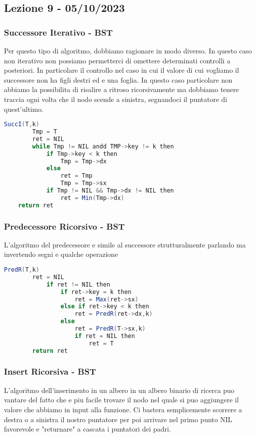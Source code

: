 \subsection{Lezione 9 - 05/10/2023}

\subsubsection{Successore Iterativo - BST}

Per questo tipo di algoritmo, dobbiamo ragionare in modo diverso. In questo caso non iterativo non possiamo permetterci di omettere determinati controlli a posteriori. In particolare il controllo nel caso in cui il valore di cui vogliamo il successore non ha figli destri ed e una foglia. In questo caso particolare non abbiamo la possibilita di risalire a ritroso ricorsivamente ma dobbiamo tenere traccia ogni volta che il nodo scende a sinistra, segnandoci il puntatore di quest'ultimo.

\begin{lstlisting}[language=Java]
	SuccI(T,k)
		Tmp = T
		ret = NIL
		while Tmp != NIL andd TMP->key != k then
			if Tmp->key < k then
				Tmp = Tmp->dx
			else 
				ret = Tmp
				Tmp = Tmp->sx
			if Tmp != NIL && Tmp->dx != NIL then
				ret = Min(Tmp->dx)
	return ret
\end{lstlisting}


\subsubsection{Predecessore Ricorsivo - BST}
L'algoritmo del predecessore e simile al successore strutturalmente parlando ma invertendo segni e qualche operazione

\begin{lstlisting}[language=Java]
	PredR(T,k)
		ret = NIL
			if ret != NIL then
				if ret->key = k then
					ret = Max(ret->sx)
				else if ret->key < k then
					ret = PredR(ret->dx,k)
				else 
					ret = PredR(T->sx,k)
					if ret = NIL then
						ret = T
		return ret
\end{lstlisting}

\subsubsection{Insert Ricorsiva - BST}

L'algoritmo dell'inserimento in un albero in un albero binario di ricerca puo vantare del fatto che e piu facile trovare il nodo nel quale si puo aggiungere il valore che abbiamo in input alla funzione. Ci bastera semplicemente scorrere a destra o a sinistra il nostro puntatore per poi arrivare nel primo punto NIL favorevole e "returnare" a cascata i puntatori dei padri.

